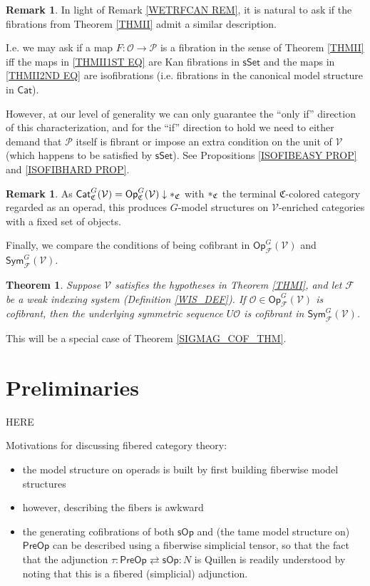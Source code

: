 \documentclass[a4paper,10pt
,draft
]{article}%
\numberwithin{equation}{section}
\numberwithin{figure}{section}
\newtheorem{theorem}[equation]{Theorem}%
\theoremstyle{definition} %
\newtheorem{remark}[equation]{Remark}%
\newcommand{\Sym}{\ensuremath{\mathsf{Sym}}}%
\newcommand{\Cat}{\mathsf{Cat}}
\newcommand{\Op}{\mathsf{Op}}%
\newcommand{\F}{\ensuremath{\mathcal F}}
\newcommand{\V}{\ensuremath{\mathcal V}}
\renewcommand{\O}{\ensuremath{\mathcal O}}
\renewcommand{\P}{\ensuremath{\mathcal P}}
\newcommand{\1}{\ensuremath{\mathbbm 1}}%
\begin{document}
\begin{remark}
	In light of Remark \ref{WETRFCAN REM}, 
	it is natural to ask if the fibrations from Theorem \ref{THMII}
	admit a similar description.
	
	I.e. we may ask if a map $F\colon \O \to \mathcal{P}$
	is a fibration in the sense of Theorem \ref{THMII}
	iff the maps in 
	\eqref{THMII1ST EQ}
	are Kan fibrations in $\mathsf{sSet}$
	and the maps in
	\eqref{THMII2ND EQ}
	are isofibrations (i.e. fibrations in the canonical model structure in $\mathsf{Cat}$).
	
	However, at our level of generality we can only guarantee the 
	``only if'' direction of this characterization,
	and for the ``if'' direction to hold we need to either demand
	that $\P$ itself is fibrant or
	impose an extra condition on the unit of $\V$ (which happens to be satisfied by $\mathsf{sSet}$).
	See Propositions \ref{ISOFIBEASY PROP} and \ref{ISOFIBHARD PROP}.	
\end{remark}




\begin{remark}
As $\Cat^{G}_{\mathfrak C}(\V) = \Op^G_{\mathfrak C}(\V) \downarrow \**_{\mathfrak C}$
with $\**_{\mathfrak C}$ the terminal $\mathfrak C$-colored category regarded as an operad,
this produces $G$-model structures on $\V$-enriched categories with a fixed set of objects.
\end{remark}



Finally, we compare the conditions of being cofibrant in $\Op^G_\F(\V)$ and $\Sym^G_\F(\V)$.
\begin{theorem}
      \label{THMIII}
      Suppose $\V$ satisfies the hypotheses in Theorem \ref{THMI},
      and let $\F$ be a weak indexing system (Definition \ref{WIS_DEF}).
      If $\O \in \Op^G_\F(\V)$ is cofibrant, then the underlying symmetric sequence $U\O$ is cofibrant in $\Sym^G_\F(\V)$.
\end{theorem}
This will be a special case of Theorem \ref{SIGMAG_COF_THM}.


\section{Preliminaries}





{\color{red} HERE}

Motivations for discussing fibered category theory:
\begin{itemize}
\item the model structure on operads is built by first building fiberwise model structures
\item however, describing the fibers is awkward
\item the generating cofibrations of both $\mathsf{sOp}$
and (the tame model structure on) $\mathsf{PreOp}$
can be described using a fiberwise simplicial tensor,
so that the fact that the adjunction
$\tau \colon \mathsf{PreOp} \rightleftarrows \mathsf{sOp}\colon N$ is Quillen is readily understood by noting that this is a fibered (simplicial) adjunction.
\end{itemize}
\end{document}
